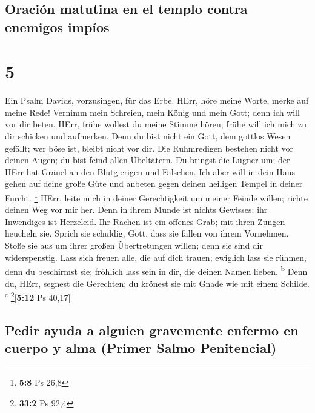 \hypertarget{oraciuxf3n-matutina-en-el-templo-contra-enemigos-impuxedos}{%
\subsection{Oración matutina en el templo contra enemigos
impíos}\label{oraciuxf3n-matutina-en-el-templo-contra-enemigos-impuxedos}}

\hypertarget{section-4}{%
\section{5}\label{section-4}}

 Ein Psalm Davids, vorzusingen, für das Erbe.
 HErr, höre meine Worte, merke auf meine Rede!
 Vernimm mein Schreien, mein König und mein Gott; denn ich
will vor dir beten.  HErr, frühe wollest du meine Stimme
hören; frühe will ich mich zu dir schicken und aufmerken. 
Denn du bist nicht ein Gott, dem gottlos Wesen gefällt; wer böse ist,
bleibt nicht vor dir.  Die Ruhmredigen bestehen nicht vor
deinen Augen; du bist feind allen Übeltätern.  Du bringst
die Lügner um; der HErr hat Gräuel an den Blutgierigen und Falschen.
 Ich aber will in dein Haus gehen auf deine große Güte und
anbeten gegen deinen heiligen Tempel in deiner Furcht. \footnote{\textbf{5:8}
  Ps 26,8}  HErr, leite mich in deiner Gerechtigkeit um
meiner Feinde willen; richte deinen Weg vor mir her. 
Denn in ihrem Munde ist nichts Gewisses; ihr Inwendiges ist Herzeleid.
Ihr Rachen ist ein offenes Grab; mit ihren Zungen heucheln sie.
 Sprich sie schuldig, Gott, dass sie fallen von ihrem
Vornehmen. Stoße sie aus um ihrer großen Übertretungen willen; denn sie
sind dir widerspenstig.  Lass sich freuen alle, die auf
dich trauen; ewiglich lass sie rühmen, denn du beschirmst sie; fröhlich
lass sein in dir, die deinen Namen lieben. \textsuperscript{b}
 Denn du, HErr, segnest die Gerechten; du krönest sie mit
Gnade wie mit einem Schilde. \textsuperscript{c}
\footnote{\textbf{33:2} Ps 92,4}{[}\textbf{5:12} Ps 40,17{]}

\hypertarget{pedir-ayuda-a-alguien-gravemente-enfermo-en-cuerpo-y-alma-primer-salmo-penitencial}{%
\subsection{Pedir ayuda a alguien gravemente enfermo en cuerpo y alma
(Primer Salmo
Penitencial)}\label{pedir-ayuda-a-alguien-gravemente-enfermo-en-cuerpo-y-alma-primer-salmo-penitencial}}

